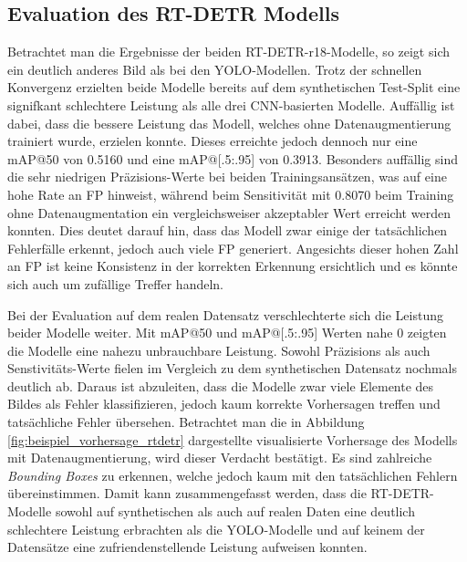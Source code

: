 \subsection[Evaluation des RT-DETR Modells]{Evaluation des \ac{RT-DETR} Modells}

Betrachtet man die Ergebnisse der beiden \ac{RT-DETR}-r18-Modelle, so zeigt sich ein deutlich anderes Bild als bei den \ac{YOLO}-Modellen. Trotz der schnellen Konvergenz erzielten beide Modelle bereits auf dem synthetischen Test-Split eine signifkant schlechtere Leistung als alle drei \ac{CNN}-basierten Modelle. Auffällig ist dabei, dass die bessere Leistung das Modell, welches ohne Datenaugmentierung trainiert wurde, erzielen konnte. Dieses erreichte jedoch dennoch nur eine \ac{mAP}@50 von 0.5160 und eine \ac{mAP}@[.5:.95] von 0.3913. Besonders auffällig sind die sehr niedrigen Präzisions-Werte bei beiden Trainingsansätzen, was auf eine hohe Rate an \ac{FP} hinweist, während beim Sensitivität mit 0.8070 beim Training ohne Datenaugmentation ein vergleichsweiser akzeptabler Wert erreicht werden konnten. Dies deutet darauf hin, dass das Modell zwar einige der tatsächlichen Fehlerfälle erkennt, jedoch auch viele \ac{FP} generiert. Angesichts dieser hohen Zahl an \ac{FP} ist keine Konsistenz in der korrekten Erkennung ersichtlich und es könnte sich auch um zufällige Treffer handeln.

Bei der Evaluation auf dem realen Datensatz verschlechterte sich die Leistung beider Modelle weiter. Mit \ac{mAP}@50 und \ac{mAP}@[.5:.95] Werten nahe 0 zeigten die Modelle eine nahezu unbrauchbare Leistung. Sowohl Präzisions als auch Senstivitäts-Werte fielen im Vergleich zu dem synthetischen Datensatz nochmals deutlich ab. Daraus ist abzuleiten, dass die Modelle zwar viele Elemente des Bildes als Fehler klassifizieren, jedoch kaum korrekte Vorhersagen treffen und tatsächliche Fehler übersehen. Betrachtet man die in Abbildung \ref{fig:beispiel_vorhersage_rtdetr} dargestellte visualisierte Vorhersage des Modells mit Datenaugmentierung, wird dieser Verdacht bestätigt. Es sind zahlreiche \textit{Bounding Boxes} zu erkennen, welche jedoch kaum mit den tatsächlichen Fehlern übereinstimmen. Damit kann zusammengefasst werden, dass die \ac{RT-DETR}-Modelle sowohl auf synthetischen als auch auf realen Daten eine deutlich schlechtere Leistung erbrachten als die \ac{YOLO}-Modelle und auf keinem der Datensätze eine zufriendenstellende Leistung aufweisen konnten.

